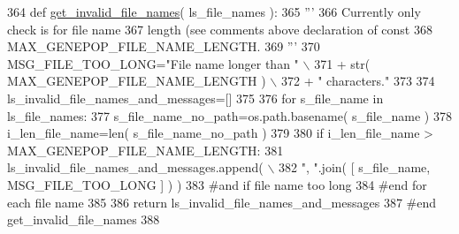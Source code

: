 \begin{DoxyCode}
364 \textcolor{keyword}{def }\hyperlink{namespacenegui_1_1pgdriveneestimator_a944008262ae2ee7c6fc796499be626ce}{get\_invalid\_file\_names}( ls\_file\_names ):
365     \textcolor{stringliteral}{'''}
366 \textcolor{stringliteral}{    Currently only check is for file name}
367 \textcolor{stringliteral}{    length (see comments above declaration of const }
368 \textcolor{stringliteral}{    MAX\_GENEPOP\_FILE\_NAME\_LENGTH.}
369 \textcolor{stringliteral}{    '''}
370     MSG\_FILE\_TOO\_LONG=\textcolor{stringliteral}{"File name longer than "} \(\backslash\)
371             + str( MAX\_GENEPOP\_FILE\_NAME\_LENGTH ) \(\backslash\)
372             + \textcolor{stringliteral}{" characters."}
373 
374     ls\_invalid\_file\_names\_and\_messages=[]
375 
376     \textcolor{keywordflow}{for} s\_file\_name \textcolor{keywordflow}{in} ls\_file\_names:
377         s\_file\_name\_no\_path=os.path.basename( s\_file\_name )
378         i\_len\_file\_name=len( s\_file\_name\_no\_path )
379 
380         \textcolor{keywordflow}{if} i\_len\_file\_name > MAX\_GENEPOP\_FILE\_NAME\_LENGTH:
381             ls\_invalid\_file\_names\_and\_messages.append( \(\backslash\)
382                     \textcolor{stringliteral}{", "}.join( [ s\_file\_name, MSG\_FILE\_TOO\_LONG ] ) )
383         \textcolor{comment}{#and if file name too long}
384     \textcolor{comment}{#end for each file name}
385 
386     \textcolor{keywordflow}{return} ls\_invalid\_file\_names\_and\_messages
387 \textcolor{comment}{#end get\_invalid\_file\_names}
388 
\end{DoxyCode}
